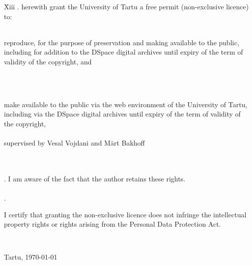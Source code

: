 \documentclass{style/bachelor-thesis}
\begin{document}
\begin{tabbing}
\= Xiii\=\kill
{}. \> herewith grant the University of Tartu a free permit (non-exclusive licence) to:\\\\ 

\> 
\begin{minipage}[t]{14.2cm}
reproduce, for the purpose of preservation and making available to the public, including for addition to the DSpace digital archives until expiry of the term of validity of the copyright, and
\end{minipage}
\\\\
\begin{minipage}[t]{14.2cm}
make available to the public via the web environment of the University of Tartu, including via the DSpace digital archives until expiry of the term of validity of the copyright,\\ 

\articleName\\   

supervised by Vesal Vojdani and Märt Bakhoff

\end{minipage}\\\\ 
. \>I am aware of the fact that the author retains these rights.\\\\
. \>
\begin{minipage}[t]{14.2cm}
I certify that granting the non-exclusive licence does not infringe the intellectual property rights or rights arising from the Personal Data Protection Act. 
\end{minipage}\\
\end{tabbing}

\noindent
Tartu, \today
\end{document}
